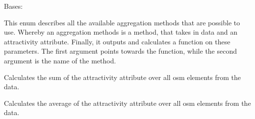\documentclass[letterpaper,10pt,english]{sphinxmanual}
\begin{document}
\begin{fulllineitems}
\label{\detokenize{apidoc/src.osm_configurator.model.project.calculation:src.osm_configurator.model.project.calculation.aggregation_method_enum.AggregationMethod}}
\pysigstartsignatures
{}
\pysigstopsignatures
\sphinxAtStartPar
Bases: 

\sphinxAtStartPar
This enum describes all the available aggregation methods that are possible to use.
Whereby an aggregation methods is a method, that takes in data and an attractivity attribute. Finally, it outputs
and calculates a function on these parameters.
The first argument points towards the function, while the second argument is the name of the method.

\begin{fulllineitems}
\label{\detokenize{apidoc/src.osm_configurator.model.project.calculation:src.osm_configurator.model.project.calculation.aggregation_method_enum.AggregationMethod.SUM}}
\pysigstartsignatures
{}
\pysigstopsignatures
\sphinxAtStartPar
Calculates the sum of the attractivity attribute over all osm elements from the data.

\end{fulllineitems}


\begin{fulllineitems}
\label{\detokenize{apidoc/src.osm_configurator.model.project.calculation:src.osm_configurator.model.project.calculation.aggregation_method_enum.AggregationMethod.AVERAGE}}
\pysigstartsignatures
{}
\pysigstopsignatures
\sphinxAtStartPar
Calculates the average of the attractivity attribute over all osm elements from the data.


\end{fulllineitems}
\end{fulllineitems}
\end{document}
